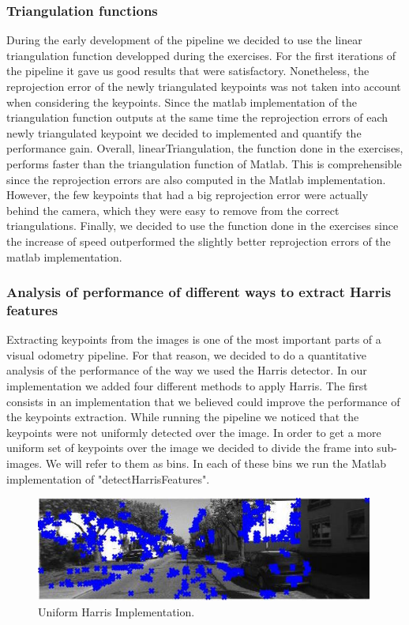 \subsubsection{Triangulation functions}
During the early development of the pipeline we decided to use the linear triangulation function developped during the exercises.
For the first iterations of the pipeline it gave us good results that were satisfactory. Nonetheless, the reprojection error of the newly
triangulated keypoints was not taken into account when considering the keypoints.
Since the matlab implementation of the triangulation function outputs at the same time the reprojection errors of each newly triangulated
keypoint we decided to implemented and quantify the performance gain.
Overall, linearTriangulation, the function done in the exercises, performs faster than the triangulation function of Matlab. This is
comprehensible since the reprojection errors are also computed in the Matlab implementation. However, the few keypoints that had a big reprojection
error were actually behind the camera, which they were easy to remove from the correct triangulations. Finally, we decided to use the function
done in the exercises since the increase of speed outperformed the slightly better reprojection errors of the matlab implementation.

\subsubsection{Analysis of performance of different ways to extract Harris features}
Extracting keypoints from the images is one of the most important parts of a visual odometry pipeline. For that reason, we
decided to do a quantitative analysis of the performance of the way we used the Harris detector.
In our implementation we added four different methods to apply Harris.
The first consists in an implementation that we believed could improve the performance of the keypoints extraction.
While running the pipeline we noticed that the keypoints were not uniformly detected over the image.
In order to get a more uniform set of keypoints over the image we decided to divide the frame into sub-images. We will refer to them
as bins. In each of these bins we run the Matlab implementation of "detectHarrisFeatures".

\begin{figure}
  \includegraphics[width=0.99\textwidth]{files/custom_uniform_keypoints.jpg}
  \caption[\label{f:custom_uniform}Uniform Harris Implementation]{Uniform Harris Implementation.}
\end{figure}

